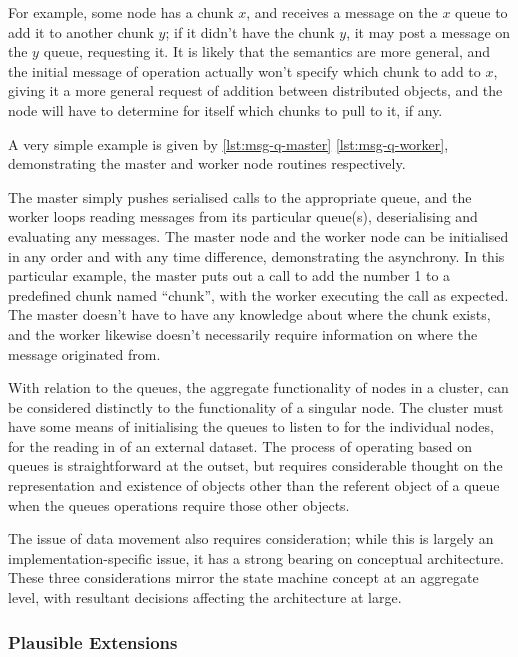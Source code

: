 For example, some node has a chunk \(x\), and receives a message on the \(x\) queue to add it to another chunk \(y\); if it didn't have the chunk \(y\), it may post a message on the \(y\) queue, requesting it.
It is likely that the semantics are more general, and the initial message of operation actually won't specify which chunk to add to \(x\), giving it a more general request of addition between distributed objects, and the node will have to determine for itself which chunks to pull to it, if any.

A very simple example is given by \cref{lst:msg-q-master} \cref{lst:msg-q-worker}, demonstrating the master and worker node routines respectively.



The master simply pushes serialised calls to the appropriate queue, and the worker loops reading messages from its particular queue(s), deserialising and evaluating any messages.
The master node and the worker node can be initialised in any order and with any time difference, demonstrating the asynchrony.
In this particular example, the master puts out a call to add the number 1 to a predefined chunk named ``chunk'', with the worker executing the call as expected.
The master doesn't have to have any knowledge about where the chunk exists, and the worker likewise doesn't necessarily require information on where the message originated from.

With relation to the queues, the aggregate functionality of nodes in a cluster, can be considered distinctly to the functionality of a singular node.
The cluster must have some means of initialising the queues to listen to for the individual nodes, for the reading in of an external dataset.
The process of operating based on queues is straightforward at the outset, but requires considerable thought on the representation and existence of objects other than the referent object of a queue when the queues operations require those other objects.

The issue of data movement also requires consideration; while this is largely an implementation-specific issue, it has a strong bearing on conceptual architecture.
These three considerations mirror the state machine concept at an aggregate level, with resultant decisions affecting the architecture at large.

\subsubsection{Plausible Extensions}\label{plausible-extensions}

